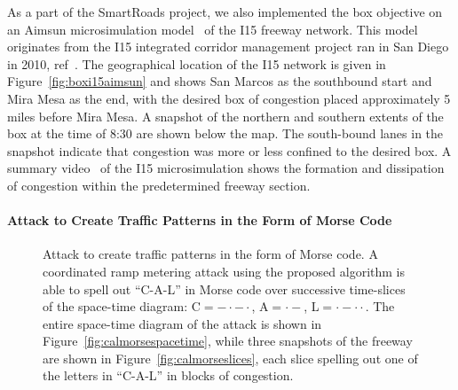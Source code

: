 As a part of the SmartRoads project, we also implemented the box objective on an Aimsun microsimulation model~\cite{barcelo2005microscopic} of the I15 freeway network. This model originates from the I15 integrated corridor management project ran in San Diego in 2010, ref~\cite{miller2010san}. The geographical location of the I15 network is given in Figure~\ref{fig:boxi15aimsun} and shows San Marcos as the southbound start and Mira Mesa as the end, with the desired box of congestion placed approximately 5 miles before Mira Mesa. A snapshot of the northern and southern extents of the box at the time of 8:30 are shown below the map. The south-bound lanes in the snapshot indicate that congestion was more or less confined to the desired box. A summary video~\cite{smartroadswebsite} of the I15 microsimulation shows the formation and dissipation of congestion within the predetermined freeway section.

\paragraph{Attack to Create Traffic Patterns in the Form of Morse Code}

\begin{figure}[h]%
\centering%
\hfill%
\caption[Attack to create traffic patterns in the form of Morse code. A coordinated ramp metering attack using the proposed algorithm is able to spell out ``C-A-L'' in Morse code over successive time-slices of the space-time diagram.]{Attack to create traffic patterns in the form of Morse code. A coordinated ramp metering attack using the proposed algorithm is able to spell out ``C-A-L'' in Morse code over successive time-slices of the space-time diagram: C$=- \cdot - \cdot$, A$= \cdot -$, L$= \cdot - \cdot \cdot$. The entire space-time diagram of the attack is shown in Figure~\ref{fig:calmorsespacetime}, while three snapshots of the freeway are shown in Figure~\ref{fig:calmorseslices}, each slice spelling out one of the letters in ``C-A-L'' in blocks of congestion.}
\label{fig:cal_morse}
\end{figure}

